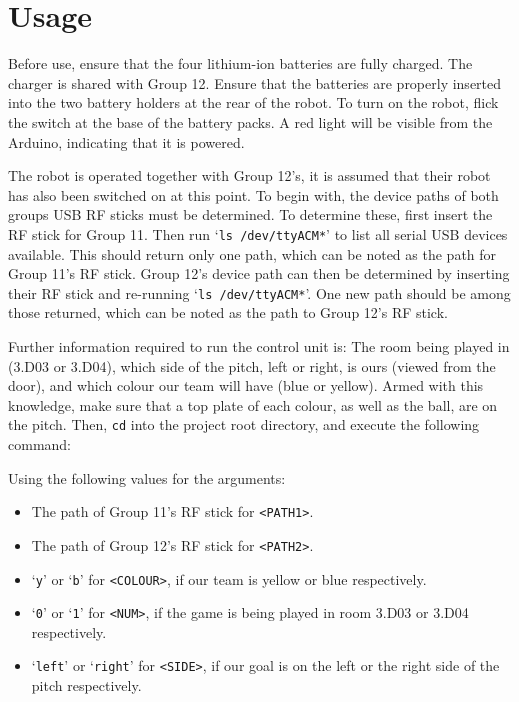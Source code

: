 \section{Usage}

Before use, ensure that the four lithium-ion batteries are fully charged. The
charger is shared with Group 12. Ensure that the batteries are properly
inserted into the two battery holders at the rear of the robot. To turn on the
robot, flick the switch at the base of the battery packs. A red light will be
visible from the Arduino, indicating that it is powered.

The robot is operated together with Group 12's, it is assumed that their
robot has also been switched on at this point. To begin with, the device paths
of both groups USB RF sticks must be determined. To determine these, first
insert the RF stick for Group 11. Then run `\texttt{ls /dev/ttyACM*}' to list
all serial USB devices available. This should return only one path, which can
be noted as the path for Group 11's RF stick. Group 12's device path can then
be determined by inserting their RF stick and re-running `\texttt{ls
/dev/ttyACM*}'.  One new path should be among those returned, which can be
noted as the path to Group 12's RF stick.

Further information required to run the control unit is: The room being played
in (3.D03 or 3.D04), which side of the pitch, left or right, is ours (viewed
from the door), and which colour our team will have (blue or yellow). Armed
with this knowledge, make sure that a top plate of each colour, as well as the
ball, are on the pitch. Then, \texttt{cd} into the project root directory, and
execute the following command:


\noindent Using the following values for the arguments:

\begin{itemize}
    \item The path of Group 11's RF stick for \texttt{<PATH1>}.
    \item The path of Group 12's RF stick for \texttt{<PATH2>}.
    \item `\texttt{y}' or `\texttt{b}' for \texttt{<COLOUR>}, if our team is
        yellow or blue respectively.
    \item `\texttt{0}' or `\texttt{1}' for \texttt{<NUM>}, if the game is being
        played in room 3.D03 or 3.D04 respectively.
    \item `\texttt{left}' or `\texttt{right}' for \texttt{<SIDE>}, if our goal
        is on the left or the right side of the pitch respectively.
\end{itemize}

